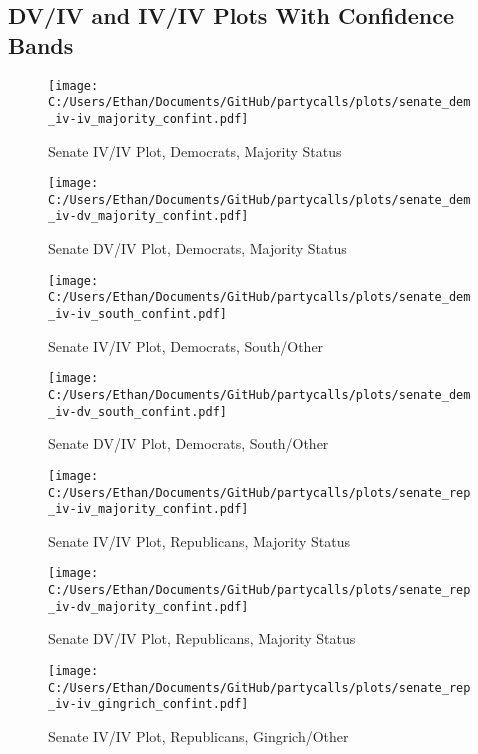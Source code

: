 \documentclass[12pt]{article}
\begin{document}
\pagebreak

\subsection{DV/IV and IV/IV Plots With Confidence Bands}

\begin{figure}[H]
	\centering
	\caption{Senate IV/IV Plot, Democrats, Majority Status}
	\texttt{[image: C:/Users/Ethan/Documents/GitHub/partycalls/plots/senate\_dem\_iv-iv\_majority\_confint.pdf]}
\end{figure}

\begin{figure}[H]
	\centering
	\caption{Senate DV/IV Plot, Democrats, Majority Status}
	\texttt{[image: C:/Users/Ethan/Documents/GitHub/partycalls/plots/senate\_dem\_iv-dv\_majority\_confint.pdf]}
\end{figure}

\begin{figure}[H]
	\centering
	\caption{Senate IV/IV Plot, Democrats, South/Other}
	\texttt{[image: C:/Users/Ethan/Documents/GitHub/partycalls/plots/senate\_dem\_iv-iv\_south\_confint.pdf]}
\end{figure}

\begin{figure}[H]
	\centering
	\caption{Senate DV/IV Plot, Democrats, South/Other}
	\texttt{[image: C:/Users/Ethan/Documents/GitHub/partycalls/plots/senate\_dem\_iv-dv\_south\_confint.pdf]}
\end{figure}

\begin{figure}[H]
	\centering
	\caption{Senate IV/IV Plot, Republicans, Majority Status}
	\texttt{[image: C:/Users/Ethan/Documents/GitHub/partycalls/plots/senate\_rep\_iv-iv\_majority\_confint.pdf]}
\end{figure}

\begin{figure}[H]
	\centering
	\caption{Senate DV/IV Plot, Republicans, Majority Status}
	\texttt{[image: C:/Users/Ethan/Documents/GitHub/partycalls/plots/senate\_rep\_iv-dv\_majority\_confint.pdf]}
\end{figure}

\begin{figure}[H]
	\centering
	\caption{Senate IV/IV Plot, Republicans, Gingrich/Other}
	\texttt{[image: C:/Users/Ethan/Documents/GitHub/partycalls/plots/senate\_rep\_iv-iv\_gingrich\_confint.pdf]}
\end{figure}
\end{document}
